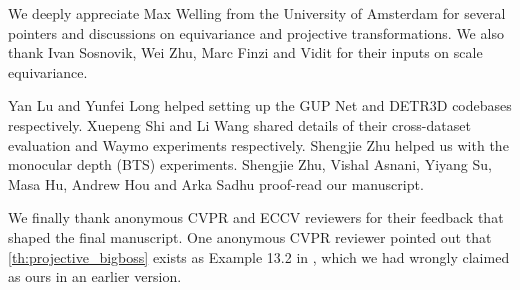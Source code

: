 \documentclass[runningheads]{llncs}
\newcommand{\equivariance}{equivariance}
\newcommand{\gupNet}{GUP Net}
\begin{document}
    We deeply appreciate Max Welling from the University of Amsterdam for several pointers and discussions on \equivariance{} and projective transformations.
    We also thank Ivan Sosnovik, Wei Zhu, Marc Finzi and Vidit for their inputs on scale \equivariance{}.
    
    Yan Lu and Yunfei Long helped setting up the \gupNet{} \cite{lu2021geometry} and DETR3D \cite{wang2021detr3d} codebases respectively.
    Xuepeng Shi and Li Wang shared details of their cross-dataset evaluation \cite{shi2021geometry} and Waymo experiments \cite{wang2021progressive} respectively.
    Shengjie Zhu helped us with the monocular depth (BTS) \cite{lee2019big} experiments.
    Shengjie Zhu, Vishal Asnani, Yiyang Su, Masa Hu, Andrew Hou and Arka Sadhu proof-read our manuscript.


    We finally thank anonymous CVPR and ECCV reviewers for their feedback that shaped the final manuscript.
    One anonymous CVPR reviewer pointed out that \cref{th:projective_bigboss} exists as Example 13.2 in \cite{hartley2003multiple}, which we had wrongly claimed as ours in an earlier version. 
\end{document}
